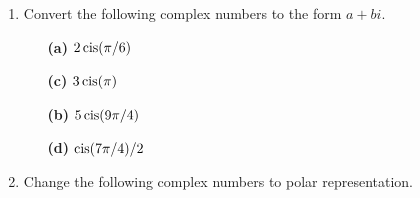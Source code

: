 {\begin{enumerate}
\begin{minipage}[t]{4.6in}
\begin{minipage}[t]{2.25in}
\begin{itemize}
\end{itemize}
\end{minipage}
\end{minipage}
 
\vspace{2pt}        %
 
 
\bf\item\rm   %
Convert the following complex numbers to the form $a + bi$.
 
 
\vspace{3pt}        %
 
\hspace{-7pt}
\begin{minipage}[t]{4.6in}
\noindent
\begin{minipage}[t]{2.25in}
\begin{itemize}
 
 \item[{\bf (a)}]
$2 \operatorname{cis}(\pi / 6 )$
 
 \item[{\bf (c)}]
$3 \operatorname{cis}(\pi)$
 
\end{itemize}
\end{minipage} \hfill
\begin{minipage}[t]{2.25in}
\begin{itemize}
 
 \item[{\bf (b)}]
$5 \operatorname{cis}(9\pi/4)$
 
 \item[{\bf (d)}]
$\operatorname{cis}(7\pi/4) /2$
 
\end{itemize}
\end{minipage}
\end{minipage}
 
\vspace{2pt}        %
 
 
\bf\item\rm	  %
Change the following complex numbers to polar representation.
 
 
\vspace{3pt}        %
 
\hspace{-7pt}
\begin{minipage}[t]{4.6in}
\noindent
\begin{minipage}[t]{2.25in}
\begin{itemize}
 

\end{itemize}
\end{minipage}
\end{minipage}
\end{enumerate}}
